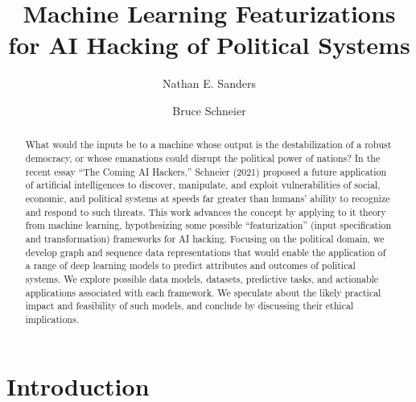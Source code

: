 \documentclass[nonacm,12pt]{acmart}
\begin{document}
\title{Machine Learning Featurizations for AI Hacking of Political Systems}

\author{Nathan E. Sanders}
\authornotemark[1]

\author{Bruce Schneier}
\authornotemark[2]

\renewcommand{\shortauthors}{Sanders and Schneier}

\begin{abstract}
  What would the inputs be to a machine whose output is the destabilization of a robust democracy, or whose emanations could disrupt the political power of nations? In the recent essay ``The Coming AI Hackers,'' Schneier (2021) proposed a future application of artificial intelligences to discover, manipulate, and exploit vulnerabilities of social, economic, and political systems at speeds far greater than humans' ability to recognize and respond to such threats.  This work advances the concept by applying to it theory from machine learning, hypothesizing some possible ``featurization'' (input specification and transformation) frameworks for AI hacking. Focusing on the political domain, we develop graph and sequence data representations that would enable the application of a range of deep learning models to predict attributes and outcomes of political systems. We explore possible data models, datasets, predictive tasks, and actionable applications associated with each framework. We speculate about the likely practical impact and feasibility of such models, and conclude by discussing their ethical implications.
  
\end{abstract}

\maketitle

\section{Introduction}
\end{document}
